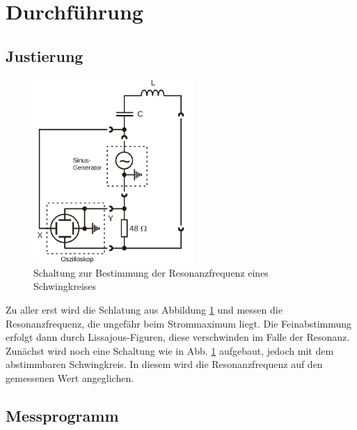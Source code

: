 \newpage
\section{Durchführung}
\label{sec:Durchführung}
\subsection{Justierung}
\begin{figure}
  \centering
  \includegraphics[height= 7cm]{./logos/Abb5.png}
  \caption{Schaltung zur Bestimmung der Resonanzfrequenz eines Schwingkreises}
  \label{fig:Abb5}
\end{figure}
\FloatBarrier
Zu aller erst wird die Schlatung aus Abbildung \ref{fig:Abb5} und messen die Resonanzfrequenz, die ungefähr beim Strommaximum liegt. Die Feinabstimmung
erfolgt dann durch Lissajous-Figuren, diese verschwinden im Falle der Resonanz. Zunächst wird  noch eine Schaltung wie in Abb. \ref{fig:Abb5} aufgebaut, jedoch mit dem
abstimmbaren Schwingkreis. In diesem wird die Resonanzfrequenz auf den gemessenen Wert angeglichen.
\newpage
\subsection{Messprogramm}
